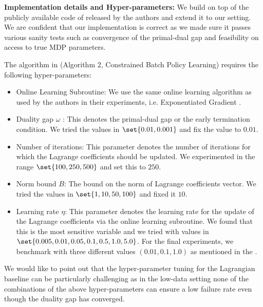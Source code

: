 \textbf{Implementation details and Hyper-parameters:} We build on top of the publicly available code of \cite{le2019batch} released by the authors and extend it to our setting. 
We are confident that our implementation is correct as we made sure it passes various sanity tests such as convergence of the primal-dual gap and feasibility on access to true MDP parameters.

The algorithm in \cite{le2019batch} (Algorithm 2, Constrained Batch Policy Learning) requires the following hyper-parameters:

\begin{itemize}
    \item Online Learning Subroutine: We use the same online learning algorithm as used by the authors in their experiments, i.e. Exponentiated Gradient \citep{kivinen1997exponentiated}.
    
    \item Duality gap $\omega$ : This denotes the primal-dual gap or the early termination condition. We tried the values in $\set{0.01, 0.001}$ and fix the value to $0.01$.
    
    \item Number of iterations: This parameter denotes the number of iterations for which the Lagrange coefficients should be updated. We experimented in the range $\set{100, 250, 500}$ and set this to $250$.
    
    \item Norm bound $B$: The bound on the norm of Lagrange coefficients vector. We tried the values in $\set{1, 10, 50, 100}$ and fixed it $10$.
    
    \item Learning rate $\eta$: This parameter denotes the learning rate for the update of the Lagrange coefficients via the online learning subroutine. We found that this is the most sensitive variable and we tried with values in $\set{0.005, 0.01, 0.05, 0.1, 0.5, 1.0, 5.0}$. For the final experiments, we benchmark with three different values $(0.01, 0.1, 1.0)$ as mentioned in the .
    
\end{itemize}

We would like to point out that the hyper-parameter tuning for the Lagrangian baseline can be particularly challenging as in the low-data setting none of the combinations of the above hyper-parameters can ensure a low failure rate even though the duality gap has converged. 

